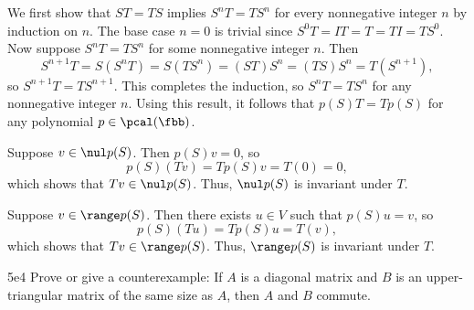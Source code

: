\begin{sol}
    We first show that $ST = TS$ implies $S^n T = TS^n$ for every nonnegative integer $n$ by induction on $n$.
    The base case $n = 0$ is trivial since $S^0 T = I T = T = T I = TS^0$.
    Now suppose $S^n T = TS^n$ for some nonnegative integer $n$.
    Then
    \[
        S^{n+1} T = S(S^n T) = S(TS^n) = (ST)S^n = (TS)S^n = T(S^{n+1}),
    \]
    so $S^{n+1} T = TS^{n+1}$.
    This completes the induction, so $S^n T = TS^n$ for any nonnegative integer $n$.
    Using this result, it follows that $p(S)T = Tp(S)$ for any polynomial $p \in \pcal(\fbb)$.
    \begin{subexercises}
        \item Suppose $v \in \nul p(S)$.
        Then $p(S)v = 0$, so
        \[
            p(S)(Tv) = Tp(S)v = T(0) = 0,
        \]
        which shows that $Tv \in \nul p(S)$.
        Thus, $\nul p(S)$ is invariant under $T$.
        \item Suppose $v \in \range p(S)$.
        Then there exists $u \in V$ such that $p(S)u = v$, so
        \[
            p(S)(Tu) = Tp(S)u = T(v),
        \]
        which shows that $Tv \in \range p(S)$.
        Thus, $\range p(S)$ is invariant under $T$. \qedhere
    \end{subexercises}
\end{sol}

\begin{exercise}{5e4}
    Prove or give a counterexample: If $A$ is a diagonal matrix and $B$ is an upper-triangular matrix of the same size as $A$, then $A$ and $B$ commute.
\end{exercise}

